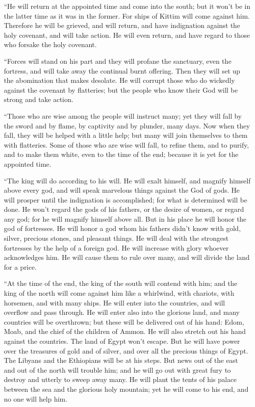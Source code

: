  ``He will return at the appointed time and come into the
south; but it won't be in the latter time as it was in the former.
 For ships of Kittim will come against him. Therefore he
will be grieved, and will return, and have indignation against the holy
covenant, and will take action. He will even return, and have regard to
those who forsake the holy covenant.

 ``Forces will stand on his part and they will profane
the sanctuary, even the fortress, and will take away the continual burnt
offering. Then they will set up the abomination that makes desolate.
 He will corrupt those who do wickedly against the
covenant by flatteries; but the people who know their God will be strong
and take action.

 ``Those who are wise among the people will instruct
many; yet they will fall by the sword and by flame, by captivity and by
plunder, many days.  Now when they fall, they will be
helped with a little help; but many will join themselves to them with
flatteries.  Some of those who are wise will fall, to
refine them, and to purify, and to make them white, even to the time of
the end; because it is yet for the appointed time.

 ``The king will do according to his will. He will exalt
himself, and magnify himself above every god, and will speak marvelous
things against the God of gods. He will prosper until the indignation is
accomplished; for what is determined will be done.  He
won't regard the gods of his fathers, or the desire of women, or regard
any god; for he will magnify himself above all.  But in
his place he will honor the god of fortresses. He will honor a god whom
his fathers didn't know with gold, silver, precious stones, and pleasant
things.  He will deal with the strongest fortresses by
the help of a foreign god. He will increase with glory whoever
acknowledges him. He will cause them to rule over many, and will divide
the land for a price.

 ``At the time of the end, the king of the south will
contend with him; and the king of the north will come against him like a
whirlwind, with chariots, with horsemen, and with many ships. He will
enter into the countries, and will overflow and pass through.
 He will enter also into the glorious land, and many
countries will be overthrown; but these will be delivered out of his
hand: Edom, Moab, and the chief of the children of Ammon.
 He will also stretch out his hand against the countries.
The land of Egypt won't escape.  But he will have power
over the treasures of gold and of silver, and over all the precious
things of Egypt. The Libyans and the Ethiopians will be at his steps.
 But news out of the east and out of the north will
trouble him; and he will go out with great fury to destroy and utterly
to sweep away many.  He will plant the tents of his
palace between the sea and the glorious holy mountain; yet he will come
to his end, and no one will help him.

